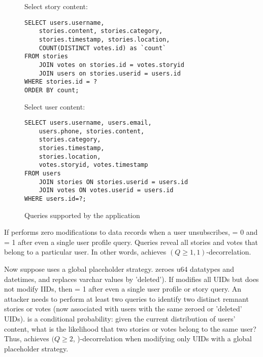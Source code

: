 \begin{figure*}
    \centering
\begin{minipage}[t]{0.45\textwidth}
    \centering
    Select story content:
\begin{verbatim}
SELECT users.username, 
    stories.content, stories.category, 
    stories.timestamp, stories.location, 
    COUNT(DISTINCT votes.id) as `count`
FROM stories 
    JOIN votes on stories.id = votes.storyid
    JOIN users on stories.userid = users.id
WHERE stories.id = ?
ORDER BY count;
\end{verbatim}
\end{minipage}
\begin{minipage}[t]{0.45\textwidth}
    \centering
    Select user content:
\begin{verbatim}
SELECT users.username, users.email, 
    users.phone, stories.content, 
    stories.category, 
    stories.timestamp, 
    stories.location, 
    votes.storyid, votes.timestamp 
FROM users 
    JOIN stories ON stories.userid = users.id 
    JOIN votes ON votes.userid = users.id
WHERE users.id=?;
\end{verbatim}
\end{minipage}
    \caption{Queries supported by the application}
\label{fig:appqs}
\end{figure*}
If \sys{} performs zero modifications to data records when a user unsubscribes, \premnant{} = 0 and
\plinked{} = 1 after even a single user profile query. Queries reveal all stories and votes that belong to a particular user. In other
words, \sys{} achieves $(Q \geq 1, 1)$-decorrelation.

Now suppose \sys{} uses a global placeholder strategy.  \sys{} zeroes u64 datatypes and datetimes,
and replaces varchar values by 'deleted').  If \sys{} modifies all UIDs but does not modify IIDs,
then \premnant{} = 1 after even a single user profile or story query.  An attacker needs to perform
at least two queries to identify two distinct remnant stories or votes (now associated with users with
the same zeroed or 'deleted' UIDs). 
\plinked{} is a conditional probability: given the current distribution of users' content, what is
the likelihood that two stories or votes belong to the same user?
Thus, \sys{} achieves $(Q \geq 2$, \plinked{})-decorrelation when modifying only UIDs with a global
placeholder strategy.
